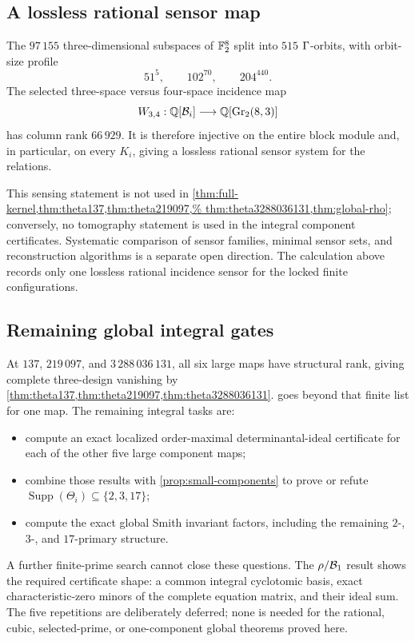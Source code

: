 \subsection{A lossless rational sensor map}

The \(97\,155\) three-dimensional subspaces of \(\mathbb F_2^8\) split into
\(515\) \(\Gamma\)-orbits, with orbit-size profile
\[
 51^5,\qquad102^{70},\qquad204^{440}.
\]
The selected three-space versus four-space incidence map
\[
 W_{3,4}:\mathbb Q[\mathcal B_i]\longrightarrow
 \mathbb Q[\operatorname{Gr}_2(8,3)]
\]
has column rank \(66\,929\).  It is therefore injective on the entire
block module and, in particular, on every \(K_i\), giving a lossless
rational sensor system for the relations.

This sensing statement is not used in
\cref{thm:full-kernel,thm:theta137,thm:theta219097,%
thm:theta3288036131,thm:global-rho}; conversely, no tomography statement
is used in the integral component certificates.  Systematic comparison
of sensor families, minimal sensor sets, and reconstruction algorithms is
a separate open direction.  The calculation above records only one lossless
rational incidence sensor for the locked finite configurations.

\subsection{Remaining global integral gates}

At \(137\), \(219\,097\), and \(3\,288\,036\,131\), all six large maps
have structural rank, giving complete three-design vanishing by
\cref{thm:theta137,thm:theta219097,thm:theta3288036131}.
 goes beyond that finite list for one map.  The
remaining integral tasks are:
\begin{itemize}
  \item compute an exact localized order-maximal determinantal-ideal
  certificate for each of the other five large component maps;
  \item combine those results with \cref{prop:small-components} to prove
  or refute \(\operatorname{Supp}(\Theta_i)\subseteq\{2,3,17\}\);
  \item compute the exact global Smith invariant factors, including the
  remaining \(2\)-, \(3\)-, and \(17\)-primary structure.
\end{itemize}
A further finite-prime search cannot close these questions.  The
\(\rho/\mathcal B_1\) result shows the required certificate shape: a common
integral cyclotomic basis, exact characteristic-zero minors of the
complete equation matrix, and their ideal sum.  The five repetitions are
deliberately deferred; none is needed for the rational, cubic,
selected-prime, or one-component global theorems proved here.

